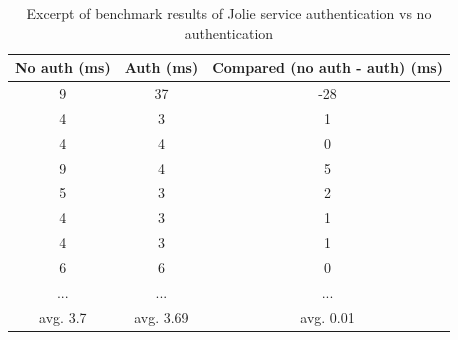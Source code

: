 \documentclass[12pt,a4paper]{article}
\begin{document}
\begin{table}[h!]
\begin{center}
\begin{tabular}{ | c | c | c | }
\hline
No auth (ms) & Auth (ms) & Compared (no auth - auth) (ms) \\ \hline
  9  &  37  &  -28  \\ \hline                                                                                                                                                                                
  4  &   3  &    1  \\ \hline                                                                                                                                                                                
  4  &   4  &    0  \\ \hline                                                                                                                                                                                
  9  &   4  &    5  \\ \hline                                                                                                                                                                                
  5  &   3  &    2  \\ \hline                                                                                                                                                                                
  4  &   3  &    1  \\ \hline                                                                                                                                                                                
  4  &   3  &    1  \\ \hline                                                                                                                                                                                
  6  &   6  &    0  \\ \hline                                                                                                                                                                                
  ... & ... & ... \\ \hline
  avg. 3.7 & avg. 3.69 & avg. 0.01 \\ \hline 
\end{tabular}
\label{table:jolieAuthResults}
\caption{Excerpt of benchmark results of Jolie service authentication vs no authentication}
\end{center}
\end{table}
\end{document}
